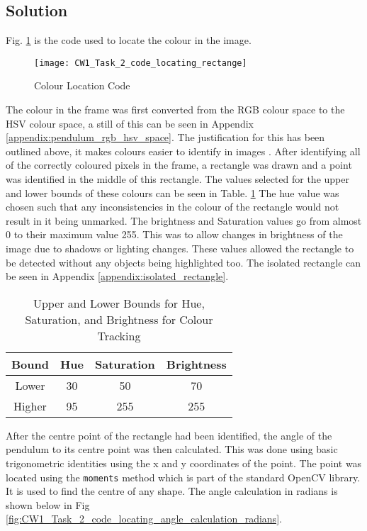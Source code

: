 \documentclass[conference]{IEEEtran}
\begin{document}
\subsection{Solution}
Fig. \ref{fig:CW1_Task_2_code_locating_rectange} is the code used to locate the colour in the image. 

\begin{figure}
\centerline{\texttt{[image: CW1\_Task\_2\_code\_locating\_rectange]}}
\caption{Colour Location Code}
\label{fig:CW1_Task_2_code_locating_rectange}
\end{figure}

The colour in the frame was first converted from the RGB colour space to the HSV colour space, a still of this can be seen in Appendix \ref{appendix:pendulum_rgb_hsv_space}. The justification for this has been outlined above, it makes colours easier to identify in images \cite{ref:HSV_vs_RGB}. After identifying all of the correctly coloured pixels in the frame, a rectangle was drawn and a point was identified in the middle of this rectangle. 
The values selected for the upper and lower bounds of these colours can be seen in Table. \ref{table:upper_and_lower_bounds} The hue value was chosen such that any inconsistencies in the colour of the rectangle would not result in it being unmarked. The brightness and Saturation values go from almost 0 to their maximum value 255. This was to allow changes in brightness of the image due to shadows or lighting changes.  These values allowed the rectangle to be detected without any objects being highlighted too. The isolated rectangle can be seen in Appendix \ref{appendix:isolated_rectangle}.

\begin{table}
\begin{center}
\caption{Upper and Lower Bounds for Hue, Saturation, and Brightness for Colour Tracking}
\begin{tabular}{ || c || c | c | c || }
\hline
 Bound & Hue & Saturation & Brightness \\ 
\hline
 Lower & 30 & 50 & 70 \\  
\hline
 Higher & 95 & 255 & 255 \\    
\hline

\end{tabular}
\label{table:upper_and_lower_bounds}
\end{center}
\end{table}

After the centre point of the rectangle had been identified, the angle of the pendulum to its centre point was then calculated. This was done using basic trigonometric identities using the x and y coordinates of the point. The point was located using the \verb|moments| method which is part of the standard OpenCV library. It is used to find the centre of any shape. The angle calculation in radians is shown below in Fig \ref{fig:CW1_Task_2_code_locating_angle_calculation_radians}. 
\end{document}
